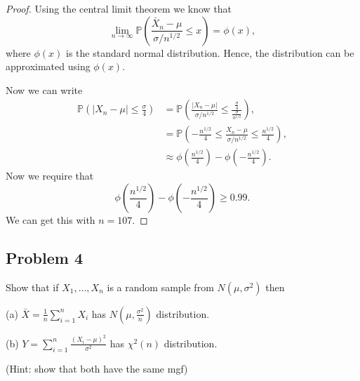 \documentclass{article}
\renewcommand{\P}[1]{\mathbb{P}\left(#1\right)}
\newcommand{\randsamp}{X_1,\dots,X_n}
\begin{document}
\begin{proof}
    Using the central limit theorem we know that
    \begin{equation*}
        \lim_{n\to \infty} \P{\frac{\bar{X}_n - \mu}{\sigma/n^{1/2}} \leq x} = \phi(x),
    \end{equation*}
    where $\phi(x)$ is the standard normal distribution. Hence, the distribution can
    be approximated using $\phi(x)$.

    Now we can write
    \begin{align*}
        \P{|X_n - \mu| \leq \frac{\sigma}{4}}
         & = \P{\frac{|X_n - \mu|}{\sigma/n^{1/2}} \leq \frac{\frac{\sigma}{4}}{\frac{\sigma}{n^{1/2}}}}, \\
         & = \P{-\frac{n^{1/2}}{4} \leq \frac{X_n - \mu}{\sigma/n^{1/2}} \leq \frac{n^{1/2}}{4}},         \\
         & \approx \phi\left(\frac{n^{1/2}}{4}\right) - \phi\left(-\frac{n^{1/2}}{4}\right).
    \end{align*}
    Now we require that
    \begin{equation*}
        \phi\left(\frac{n^{1/2}}{4}\right) - \phi\left(-\frac{n^{1/2}}{4}\right) \geq 0.99.
    \end{equation*}
    We can get this with $n = 107$.
\end{proof}

\subsection*{Problem 4}
Show that if $\randsamp$ is a random sample from $N(\mu, \sigma^2)$ then

(a) $\bar{X} = \frac{1}{n} \sum_{i=1}^n X_i$ has $N(\mu, \frac{\sigma^2}{n})$ distribution.

(b) $Y = \sum_{i=1}^n \frac{(X_i - \mu)^2}{\sigma^2}$ has $\chi^2(n)$ distribution.

(Hint: show that both have the same mgf)
\end{document}
